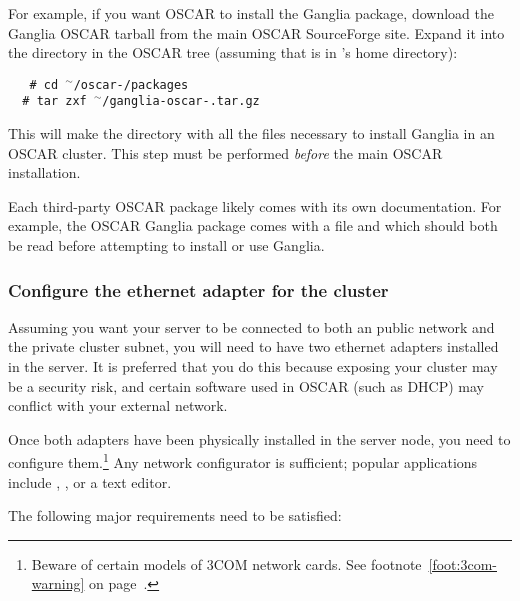 For example, if you want OSCAR to install the Ganglia package,
download the Ganglia OSCAR tarball from the main OSCAR SourceForge
site.  Expand it into the  directory in the OSCAR tree
(assuming that  is in
's home directory):

\vspace{11pt}

{\tt 
\ \ \# cd $^{\sim}$/oscar-\oscarversion/packages \\
\indent \ \ \# tar zxf $^{\sim}$/ganglia-oscar-\oscarversion.tar.gz
}

\vspace{11pt}

This will make the directory
 with all the files
necessary to install Ganglia in an OSCAR cluster.  This step must be
performed {\em before} the main OSCAR installation.

Each third-party OSCAR package likely comes with its own
documentation.  For example, the OSCAR Ganglia package comes with a
 file and  which should both
be read before attempting to install or use Ganglia.


\subsubsection{Configure the ethernet adapter for the cluster} 
\label{det:serveradapter}

Assuming you want your server to be connected to both an public
network and the private cluster subnet, you will need to have two
ethernet adapters installed in the server. It is preferred that you do
this because exposing your cluster may be a security risk, and certain
software used in OSCAR (such as DHCP) may conflict with your external
network.

\begchange

Once both adapters have been physically installed in the server node,
you need to configure them.\footnote{Beware of certain models of 3COM
  network cards.  See footnote~\ref{foot:3com-warning} on
  page~\pageref{foot:3com-warning}.}  Any network configurator is
sufficient; popular applications include , , or
a text editor.

The following major requirements need to be satisfied:


